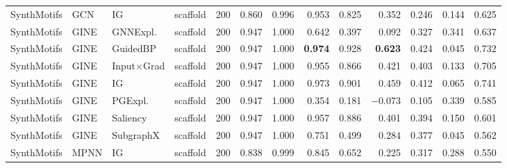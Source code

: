 \begin{table}[t]
{\begin{tabular}{lllcrrrrrrrrr}
SynthMotifs & GCN & IG & scaffold & 200 & 0.860 & 0.996 & 0.953 & 0.825 & 0.352 & 0.246 & 0.144 & 0.625 \\
SynthMotifs & GINE & GNNExpl. & scaffold & 200 & 0.947 & 1.000 & 0.642 & 0.397 & 0.092 & 0.327 & 0.341 & 0.637 \\
SynthMotifs & GINE & GuidedBP & scaffold & 200 & 0.947 & 1.000 & \textbf{0.974} & 0.928 & \textbf{0.623} & 0.424 & 0.045 & 0.732 \\
SynthMotifs & GINE & Input$\times$Grad & scaffold & 200 & 0.947 & 1.000 & 0.955 & 0.866 & 0.421 & 0.403 & 0.133 & 0.705 \\
SynthMotifs & GINE & IG & scaffold & 200 & 0.947 & 1.000 & 0.973 & 0.901 & 0.459 & 0.412 & 0.065 & 0.741 \\
SynthMotifs & GINE & PGExpl. & scaffold & 200 & 0.947 & 1.000 & 0.354 & 0.181 & $-$0.073 & 0.105 & 0.339 & 0.585 \\
SynthMotifs & GINE & Saliency & scaffold & 200 & 0.947 & 1.000 & 0.957 & 0.886 & 0.401 & 0.394 & 0.150 & 0.601 \\
SynthMotifs & GINE & SubgraphX & scaffold & 200 & 0.947 & 1.000 & 0.751 & 0.499 & 0.284 & 0.377 & 0.045 & 0.562 \\
SynthMotifs & MPNN & IG & scaffold & 200 & 0.838 & 0.999 & 0.845 & 0.652 & 0.225 & 0.317 & 0.288 & 0.550 \\
\bottomrule
\end{tabular}}
\end{table}
